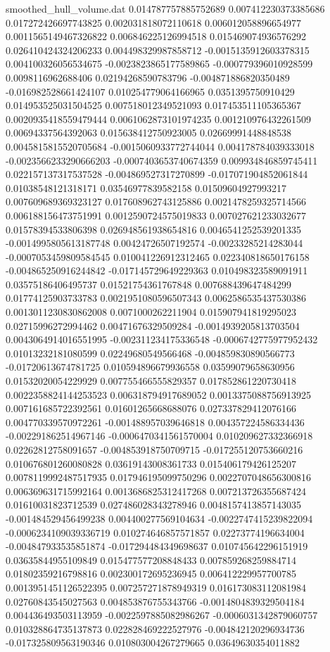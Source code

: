 \begin{filecontents}{smoothed_hull_volume.dat}
0.014787757885752689	0.007412230373385686	0.017272426697743825	0.002031818072110618	0.006012058896654977	0.0011565149467326822	0.006846225126994518	0.015469074936576292	0.026410424324206233	0.004498329987858712	-0.0015135912603378315	0.004100326056534675	-0.0023823865177589865	-0.000779396010928599	0.0098116962688406	0.02194268590783796	-0.004871886820350489	-0.016982528661424107	0.010254779064166965	0.0351395750910429
0.014953525031504525	0.007518012349521093	0.017453511105365367	0.0020935418559479444	0.0061062873101974235	0.001210976432261509	0.00694337564392063	0.015638412750923005	0.02669991448848538	0.0045815815520705684	-0.0015060933772744044	0.004178784039333018	-0.0023566233290666203	-0.0007403653740674359	0.009934846859745411	0.022157137317537528	-0.004869527317270899	-0.017071904852061844	0.01038548121318171	0.03546977839582158
0.01509604927993217	0.007609689369323127	0.017608962743125886	0.0021478259325714566	0.006188156473751991	0.0012590724575019833	0.007027621233032677	0.01578394533806398	0.026948561938654816	0.0046541252539201335	-0.0014995805613187748	0.00424726507192574	-0.00233285214283044	-0.0007053459809584545	0.010041226912312465	0.022340818650176158	-0.004865250916244842	-0.017145729649229363	0.010498323589091911	0.03575186406495737
0.01521754361767848	0.007688439647484299	0.01774125903733783	0.0021951080596507343	0.0062586535437530386	0.0013011230830862008	0.0071000262211904	0.015907941819295023	0.02715996272994462	0.00471676329509284	-0.0014939205813703504	0.0043064914016551995	-0.002311234175336548	-0.0006742775977952432	0.01013232181080599	0.02249680549566468	-0.004859830890566773	-0.01720613674781725	0.010594896679936558	0.03599079658630956
0.01532020054229929	0.007755466555829357	0.017852861220730418	0.0022358824144253523	0.006318794917689052	0.0013375088756913925	0.007161685722392561	0.01601265668688076	0.027337829412076166	0.004770339570972261	-0.001488957039646818	0.004357224586334436	-0.002291862514967146	-0.0006470341561570004	0.010209627332366918	0.02262812758091657	-0.004853918750709715	-0.017255120753660216	0.010676801260080828	0.03619143008361733
0.015406179426125207	0.0078119992487517935	0.017946195099750296	0.0022707048656300816	0.006369631715992164	0.0013686825312417268	0.007213726355687424	0.01610031823712539	0.027486028343278946	0.0048157413857143035	-0.001484529456499238	0.004400277569104634	-0.0022747415239822094	-0.0006234109039336719	0.010274646857571857	0.02273774196634004	-0.004847933535851874	-0.017294484349698637	0.010745642296151919	0.03635844955109849
0.015477577208848433	0.007859268259884714	0.01802359216798816	0.002300172695236945	0.006412229957700785	0.0013951451126522395	0.007257271878949319	0.016173083112081984	0.02760843545027563	0.004853876755343766	-0.0014804839329504184	0.004436493503113959	-0.0022597885082986267	-0.0006031342879060757	0.010328864735137873	0.022828469222527976	-0.004842120296934736	-0.017325809563190346	0.010803004267279665	0.03649630354011882

\end{filecontents}
